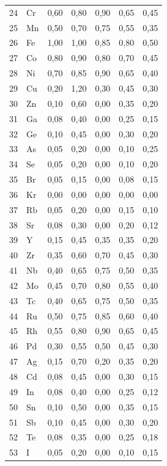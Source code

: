 \documentclass[12pt,a4paper]{article}
\begin{document}
\begin{longtable}{p{2.2cm}p{1.2cm}p{2.2cm}p{2.2cm}p{2.2cm}p{2.2cm}p{2.2cm}}
	24 & Cr  & 0,60 & 0,80 & 0,90 & 0,65 & 0,45 \\
	25 & Mn  & 0,50 & 0,70 & 0,75 & 0,55 & 0,35 \\
	26 & Fe  & 1,00 & 1,00 & 0,85 & 0,80 & 0,50 \\
	27 & Co  & 0,80 & 0,90 & 0,80 & 0,70 & 0,45 \\
	28 & Ni  & 0,70 & 0,85 & 0,90 & 0,65 & 0,40 \\
	29 & Cu  & 0,20 & 1,20 & 0,30 & 0,45 & 0,30 \\
	30 & Zn  & 0,10 & 0,60 & 0,00 & 0,35 & 0,20 \\
	31 & Ga  & 0,08 & 0,40 & 0,00 & 0,25 & 0,15 \\
	32 & Ge  & 0,10 & 0,45 & 0,00 & 0,30 & 0,20 \\
	33 & As  & 0,05 & 0,20 & 0,00 & 0,10 & 0,25 \\
	34 & Se  & 0,05 & 0,20 & 0,00 & 0,10 & 0,20 \\
	35 & Br  & 0,05 & 0,15 & 0,00 & 0,08 & 0,15 \\
	36 & Kr  & 0,00 & 0,00 & 0,00 & 0,00 & 0,00 \\
	37 & Rb  & 0,05 & 0,20 & 0,00 & 0,15 & 0,10 \\
	38 & Sr  & 0,08 & 0,30 & 0,00 & 0,20 & 0,12 \\
	39 & Y   & 0,15 & 0,45 & 0,35 & 0,35 & 0,20 \\
	40 & Zr  & 0,35 & 0,60 & 0,70 & 0,45 & 0,30 \\
	41 & Nb  & 0,40 & 0,65 & 0,75 & 0,50 & 0,35 \\
	42 & Mo  & 0,45 & 0,70 & 0,80 & 0,55 & 0,40 \\
	43 & Tc  & 0,40 & 0,65 & 0,75 & 0,50 & 0,35 \\
	44 & Ru  & 0,50 & 0,75 & 0,85 & 0,60 & 0,40 \\
	45 & Rh  & 0,55 & 0,80 & 0,90 & 0,65 & 0,45 \\
	46 & Pd  & 0,30 & 0,55 & 0,50 & 0,45 & 0,30 \\
	47 & Ag  & 0,15 & 0,70 & 0,20 & 0,35 & 0,20 \\
	48 & Cd  & 0,08 & 0,45 & 0,00 & 0,30 & 0,15 \\
	49 & In  & 0,08 & 0,40 & 0,00 & 0,25 & 0,12 \\
	50 & Sn  & 0,10 & 0,50 & 0,00 & 0,35 & 0,15 \\
	51 & Sb  & 0,10 & 0,45 & 0,00 & 0,30 & 0,20 \\
	52 & Te  & 0,08 & 0,35 & 0,00 & 0,25 & 0,18 \\
	53 & I   & 0,05 & 0,20 & 0,00 & 0,10 & 0,15 \\

\end{longtable}
\end{document}

